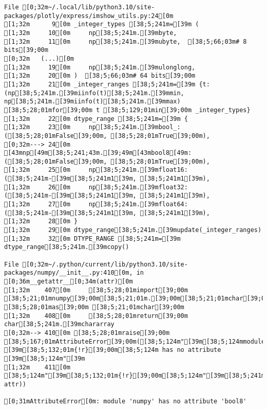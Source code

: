 \documentclass[
  letterpaper,
]{book}
\begin{document}
\begin{verbatim}
File [0;32m~/.local/lib/python3.10/site-packages/plotly/express/imshow_utils.py:24[0m
[1;32m      9[0m _integer_types [38;5;241m=[39m (
[1;32m     10[0m     np[38;5;241m.[39mbyte,
[1;32m     11[0m     np[38;5;241m.[39mubyte,  [38;5;66;03m# 8 bits[39;00m
[0;32m   (...)[0m
[1;32m     19[0m     np[38;5;241m.[39mulonglong,
[1;32m     20[0m )  [38;5;66;03m# 64 bits[39;00m
[1;32m     21[0m _integer_ranges [38;5;241m=[39m {t: (np[38;5;241m.[39miinfo(t)[38;5;241m.[39mmin, np[38;5;241m.[39miinfo(t)[38;5;241m.[39mmax) [38;5;28;01mfor[39;00m t [38;5;129;01min[39;00m _integer_types}
[1;32m     22[0m dtype_range [38;5;241m=[39m {
[1;32m     23[0m     np[38;5;241m.[39mbool_: ([38;5;28;01mFalse[39;00m, [38;5;28;01mTrue[39;00m),
[0;32m---> 24[0m     [43mnp[49m[38;5;241;43m.[39;49m[43mbool8[49m: ([38;5;28;01mFalse[39;00m, [38;5;28;01mTrue[39;00m),
[1;32m     25[0m     np[38;5;241m.[39mfloat16: ([38;5;241m-[39m[38;5;241m1[39m, [38;5;241m1[39m),
[1;32m     26[0m     np[38;5;241m.[39mfloat32: ([38;5;241m-[39m[38;5;241m1[39m, [38;5;241m1[39m),
[1;32m     27[0m     np[38;5;241m.[39mfloat64: ([38;5;241m-[39m[38;5;241m1[39m, [38;5;241m1[39m),
[1;32m     28[0m }
[1;32m     29[0m dtype_range[38;5;241m.[39mupdate(_integer_ranges)
[1;32m     32[0m DTYPE_RANGE [38;5;241m=[39m dtype_range[38;5;241m.[39mcopy()

File [0;32m~/.python/current/lib/python3.10/site-packages/numpy/__init__.py:410[0m, in [0;36m__getattr__[0;34m(attr)[0m
[1;32m    407[0m     [38;5;28;01mimport[39;00m [38;5;21;01mnumpy[39;00m[38;5;21;01m.[39;00m[38;5;21;01mchar[39;00m [38;5;28;01mas[39;00m [38;5;21;01mchar[39;00m
[1;32m    408[0m     [38;5;28;01mreturn[39;00m char[38;5;241m.[39mchararray
[0;32m--> 410[0m [38;5;28;01mraise[39;00m [38;5;167;01mAttributeError[39;00m([38;5;124m"[39m[38;5;124mmodule [39m[38;5;132;01m{!r}[39;00m[38;5;124m has no attribute [39m[38;5;124m"[39m
[1;32m    411[0m                      [38;5;124m"[39m[38;5;132;01m{!r}[39;00m[38;5;124m"[39m[38;5;241m.[39mformat([38;5;18m__name__[39m, attr))

[0;31mAttributeError[0m: module 'numpy' has no attribute 'bool8'
\end{verbatim}


\backmatter
\end{document}
